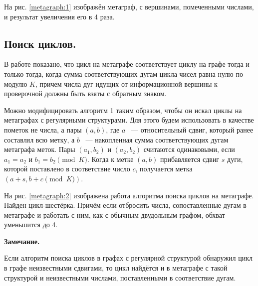 \documentclass[14pt]{mmcs-article}
\begin{document}
На рис. \ref{metagraph:1} изображён метаграф, с вершинами, помеченными числами, и результат увеличения его в 4 раза.

\subsection{Поиск циклов.}

В работе \cite{metagraphs} показано, что цикл на метаграфе соответствует циклу на графе тогда и только тогда, когда сумма соответствующих дугам цикла чисел равна нулю по модулю $K$, причем числа дуг идущих от информационной вершины к проверочной должны быть взяты с обратным знаком.

Можно модифицировать алгоритм 1 таким образом, чтобы он искал циклы на метаграфах с регулярными структурами. Для этого будем использовать в качестве пометок не числа, а пары $(a, b)$, где $a$ ~--- относительный сдвиг, который ранее составлял всю метку, а $b$ ~--- накопленная сумма соответствующих дугам метаграфа меток. Пары $(a_1, b_2)$ и $(a_2, b_2)$ считаются одинаковыми, если $a_1 = a_2$ и $b_1 = b_2 \pmod K$. Когда к метке $(a, b)$ прибавляется сдвиг $s$ дуги, которой поставлено в соответствие число $c$, получается метка $(a + s, b + c \pmod K)$.

На рис. \ref{metagraph:2} изображена работа алгоритма поиска циклов на метаграфе. Найден цикл-шестёрка. Причём если отбросить числа, сопоставленные дугам в метаграфе и работать с ним, как с обычным двудольным графом, обхват уменьшится до 4.

\textbf{Замечание.}

Если алгоритм поиска циклов в графах с регулярной структурой обнаружил цикл в графе неизвестными сдвигами, то цикл найдётся и в метаграфе с такой структурой и неизвестными числами, поставленными в соответствие дугам.
\end{document}
